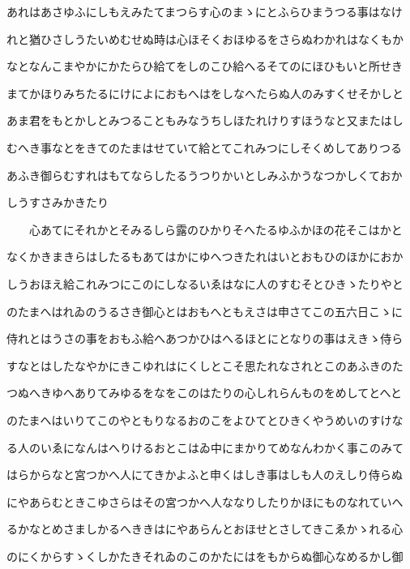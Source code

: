 \documentclass[a4paper,11pt,landscape]{ltjtarticle}
\begin{document}
\par\medskip
あれはあさゆふにしもえみたてまつらす心のまゝにとふらひまうつる事はなけ
\par\medskip
れと猶ひさしうたいめむせぬ時は心ほそくおほゆるをさらぬわかれはなくもか
\par\medskip
なとなんこまやかにかたらひ給てをしのこひ給へるそてのにほひもいと所せき
\par\medskip
まてかほりみちたるにけによにおもへはをしなへたらぬ人のみすくせそかしと
\par\medskip
あま君をもとかしとみつることもみなうちしほたれけりすほうなと又またはし
\par\medskip
むへき事なとをきてのたまはせていて給とてこれみつにしそくめしてありつる
\par\medskip
あふき御らむすれはもてならしたるうつりかいとしみふかうなつかしくておか
\par\medskip
しうすさみかきたり
\par\medskip
　　心あてにそれかとそみるしら露のひかりそへたるゆふかほの花そこはかと
\par\medskip
なくかきまきらはしたるもあてはかにゆへつきたれはいとおもひのほかにおか
\par\medskip
しうおほえ給これみつにこのにしなるいゑはなに人のすむそとひきゝたりやと
\par\medskip
のたまへはれゐのうるさき御心とはおもへともえさは申さてこの五六日こゝに
\par\medskip
侍れとはうさの事をおもふ給へあつかひはへるほとにとなりの事はえきゝ侍ら
\par\medskip
すなとはしたなやかにきこゆれはにくしとこそ思たれなされとこのあふきのた
\par\medskip
つぬへきゆへありてみゆるをなをこのはたりの心しれらんものをめしてとへと
\par\medskip
のたまへはいりてこのやともりなるおのこをよひてとひきくやうめいのすけな
\par\medskip
る人のいゑになんはへりけるおとこはゐ中にまかりてめなんわかく事このみて
\par\medskip
はらからなと宮つかへ人にてきかよふと申くはしき事はしも人のえしり侍らぬ
\par\medskip
にやあらむときこゆさらはその宮つかへ人ななりしたりかほにものなれていへ
\par\medskip
るかなとめさましかるへききはにやあらんとおほせとさしてきこゑかゝれる心
\par\medskip
のにくからすゝくしかたきそれゐのこのかたにはをもからぬ御心なめるかし御
\par\medskip
\end{document}
